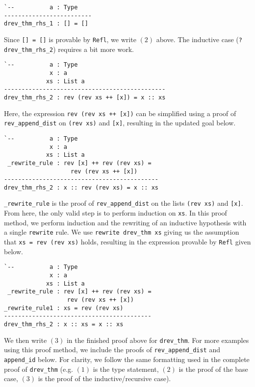 \documentclass[9pt,preprint,nocopyrightspace,computermodern]{sigplanconf} %
\begin{document}
{\small
\begin{verbatim}
`--          a : Type
-------------------------
drev_thm_rhs_1 : [] = []
\end{verbatim}
}

Since {\small\tt [] = []} is provable by {\small\tt Refl}, we write \((2)\) above.
The inductive case ({\small\tt ?drev\_thm\_rhs\_2}) requires a bit more work.

{\small
\begin{verbatim}
`--          a : Type
             x : a
            xs : List a
----------------------------------------------
drev_thm_rhs_2 : rev (rev xs ++ [x]) = x :: xs
\end{verbatim}
}

Here, the expression {\small\tt rev (rev xs ++ [x])} can be simplified using
a proof of {\small\tt rev\_append\_dist} on {\small\tt (rev xs)} and {\small\tt [x]},
resulting in the updated goal below.

{\small
\begin{verbatim}
`--          a : Type
             x : a
            xs : List a
 _rewrite_rule : rev [x] ++ rev (rev xs) = 
                   rev (rev xs ++ [x])
--------------------------------------------
drev_thm_rhs_2 : x :: rev (rev xs) = x :: xs
\end{verbatim}
}

{\small\tt \_rewrite\_rule} is the proof of {\small\tt rev\_append\_dist}
on the lists {\small\tt (rev xs)} and {\small\tt [x]}. From here, the only
valid step is to perform induction on {\small\tt xs}. In this proof method,
we perform induction and the rewriting of an inductive hypothesis with a
single {\small\tt rewrite} rule. We use {\small\tt rewrite drev\_thm xs}
giving us the assumption that {\small\tt xs = rev (rev xs)} holds,
resulting in the expression provable by {\small\tt Refl} given below.

{\small
\begin{verbatim}
`--          a : Type
             x : a
            xs : List a
 _rewrite_rule : rev [x] ++ rev (rev xs) = 
                  rev (rev xs ++ [x])
_rewrite_rule1 : xs = rev (rev xs)
------------------------------------------
drev_thm_rhs_2 : x :: xs = x :: xs
\end{verbatim}
}

We then write \((3)\) in the finished proof above for {\small\tt drev\_thm}.
For more examples using this proof method, we include the proofs of
{\small\tt rev\_append\_dist} and {\small\tt append\_id} below.
For clarity, we follow the same formatting used in the complete proof
of {\small\tt drev\_thm} (e.g. \((1)\) is the type statement,
\((2)\) is the proof of the base case, \((3)\) is the proof of the
inductive/recursive case).
\end{document}
